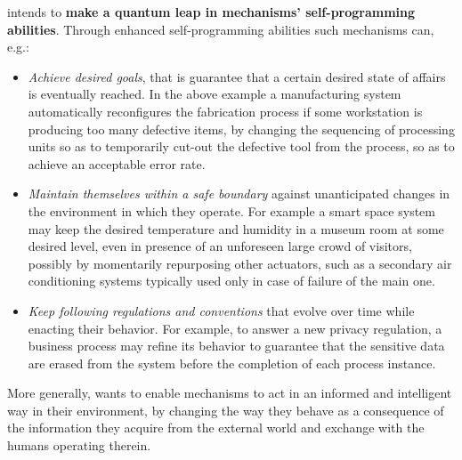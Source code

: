 

\project intends to \textbf{make a quantum leap in
mechanisms' self-programming abilities}. %
 Through enhanced self-programming abilities
 such mechanisms can, e.g.:
\begin{itemize}
\item \emph{Achieve desired goals}, that is guarantee that a certain
  desired state of affairs is eventually reached.  In the above example
  a manufacturing system automatically reconfigures the fabrication
  process if some workstation is producing too many defective items, by
  changing the sequencing of processing units so as to temporarily
  cut-out the defective tool from the process, so as to achieve an acceptable error rate.
\item \emph{Maintain themselves within a safe boundary} against unanticipated
  changes in the environment in which they operate.  For example a smart
  space system may keep the desired temperature and humidity in a
  museum room at some desired level, even in presence of an unforeseen
  large crowd of visitors, possibly by momentarily repurposing other
  actuators, such as a secondary air conditioning systems typically
  used only in case of failure of the main one.
\item \emph{Keep following regulations and conventions} that evolve
  over time while enacting their behavior.  For example, to answer a
  new privacy regulation, a business process may refine its behavior
  to guarantee that the sensitive data are erased from the system
  before the completion of each process instance.
\end{itemize}
More generally, \project wants to enable
mechanisms to act in an informed and intelligent way in their
environment, by changing the way they behave as a consequence of the
information they acquire from the external world and exchange
with the humans operating therein.

